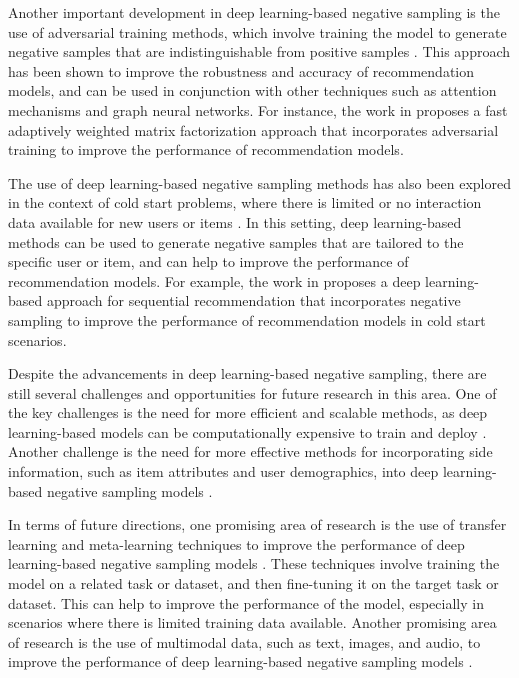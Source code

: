 \documentclass[11pt,a4paper]{article}
\begin{document}
Another important development in deep learning-based negative sampling is the use of adversarial training methods, which involve training the model to generate negative samples that are indistinguishable from positive samples \cite{doi:10.1145/3097983.3098202}. This approach has been shown to improve the robustness and accuracy of recommendation models, and can be used in conjunction with other techniques such as attention mechanisms and graph neural networks. For instance, the work in \cite{doi:10.1609/aaai.v34i04.5751} proposes a fast adaptively weighted matrix factorization approach that incorporates adversarial training to improve the performance of recommendation models.

The use of deep learning-based negative sampling methods has also been explored in the context of cold start problems, where there is limited or no interaction data available for new users or items \cite{arxiv:1608.07400}. In this setting, deep learning-based methods can be used to generate negative samples that are tailored to the specific user or item, and can help to improve the performance of recommendation models. For example, the work in \cite{arxiv:1905.01997} proposes a deep learning-based approach for sequential recommendation that incorporates negative sampling to improve the performance of recommendation models in cold start scenarios.

Despite the advancements in deep learning-based negative sampling, there are still several challenges and opportunities for future research in this area. One of the key challenges is the need for more efficient and scalable methods, as deep learning-based models can be computationally expensive to train and deploy \cite{arxiv:1707.07435}. Another challenge is the need for more effective methods for incorporating side information, such as item attributes and user demographics, into deep learning-based negative sampling models \cite{doi:10.1016/j.elerap.2019.100879}.

In terms of future directions, one promising area of research is the use of transfer learning and meta-learning techniques to improve the performance of deep learning-based negative sampling models \cite{arxiv:2206.04415}. These techniques involve training the model on a related task or dataset, and then fine-tuning it on the target task or dataset. This can help to improve the performance of the model, especially in scenarios where there is limited training data available. Another promising area of research is the use of multimodal data, such as text, images, and audio, to improve the performance of deep learning-based negative sampling models \cite{doi:10.1145/3298689.3347068}.
\end{document}

